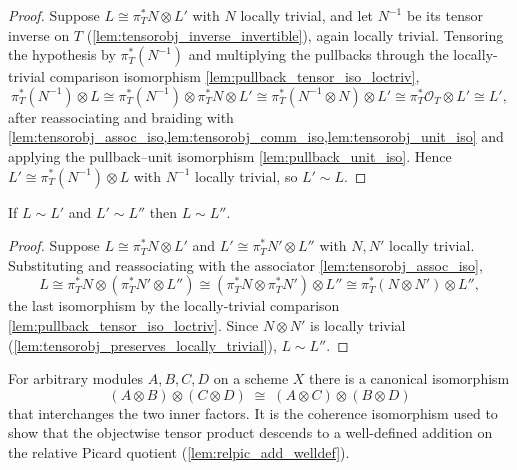 \begin{proof}
  Suppose \(L \cong \pi_T^* N \otimes L'\) with \(N\) locally trivial, and let
  \(N^{-1}\) be its tensor inverse on \(T\)
  (\cref{lem:tensorobj_inverse_invertible}), again locally trivial. Tensoring
  the hypothesis by \(\pi_T^*(N^{-1})\) and multiplying the pullbacks through
  the locally-trivial comparison isomorphism
  \cref{lem:pullback_tensor_iso_loctriv},
  \[
    \pi_T^*(N^{-1}) \otimes L
      \cong \pi_T^*(N^{-1}) \otimes \pi_T^* N \otimes L'
      \cong \pi_T^*(N^{-1} \otimes N) \otimes L'
      \cong \pi_T^* \mathcal{O}_T \otimes L'
      \cong L' ,
  \]
  after reassociating and braiding with
  \cref{lem:tensorobj_assoc_iso,lem:tensorobj_comm_iso,lem:tensorobj_unit_iso}
  and applying the pullback--unit isomorphism \cref{lem:pullback_unit_iso}.
  Hence \(L' \cong \pi_T^*(N^{-1}) \otimes L\) with \(N^{-1}\) locally trivial,
  so \(L' \sim L\).
\leanok
\end{proof}

\begin{lemma}\leanok
  \label{lem:relpic_setoid_trans}
  If \(L \sim L'\) and \(L' \sim L''\) then \(L \sim L''\).
\end{lemma}

\begin{proof}
  Suppose \(L \cong \pi_T^* N \otimes L'\) and \(L' \cong \pi_T^* N' \otimes L''\)
  with \(N, N'\) locally trivial. Substituting and reassociating with the
  associator \cref{lem:tensorobj_assoc_iso},
  \[
    L \cong \pi_T^* N \otimes (\pi_T^* N' \otimes L'')
      \cong (\pi_T^* N \otimes \pi_T^* N') \otimes L''
      \cong \pi_T^*(N \otimes N') \otimes L'' ,
  \]
  the last isomorphism by the locally-trivial comparison
  \cref{lem:pullback_tensor_iso_loctriv}. Since \(N \otimes N'\) is locally
  trivial (\cref{lem:tensorobj_preserves_locally_trivial}), \(L \sim L''\).
\leanok
\end{proof}

\begin{lemma}
  \label{lem:tensor_middle_four}
  For arbitrary modules \(A, B, C, D\) on a scheme \(X\) there is a canonical
  isomorphism
  \[
    (A \otimes B) \otimes (C \otimes D)
      \;\cong\;
    (A \otimes C) \otimes (B \otimes D)
  \]
  that interchanges the two inner factors. It is the coherence isomorphism used
  to show that the objectwise tensor product descends to a well-defined addition
  on the relative Picard quotient (\cref{lem:relpic_add_welldef}).
\end{lemma}


